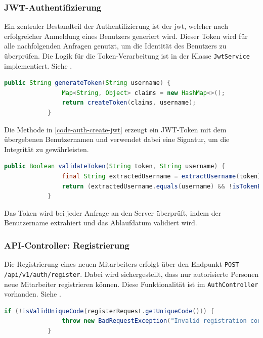 		\subsubsection{JWT-Authentifizierung}
		
		Ein zentraler Bestandteil der Authentifizierung ist der \gls{jwt}, welcher nach erfolgreicher Anmeldung eines Benutzers generiert wird. Dieser Token wird für alle nachfolgenden Anfragen genutzt, um die Identität des Benutzers zu überprüfen. Die Logik für die Token-Verarbeitung ist in der Klasse \texttt{JwtService} implementiert. Siehe \cite{prompt-gpt-authentication-implementation}.
		
		\begin{lstlisting}[caption={Generierung eines JWT-Tokens für einen Benutzer.}, label={code-auth-create-jwt}, language=Java]
			public String generateToken(String username) {
				Map<String, Object> claims = new HashMap<>();
				return createToken(claims, username);
			}
		\end{lstlisting}
		
		
		Die Methode in \ref{code-auth-create-jwt} erzeugt ein JWT-Token mit dem übergebenen Benutzernamen und verwendet dabei eine Signatur, um die Integrität zu gewährleisten. 
		
		\begin{lstlisting}[caption={Validierung eines JWT-Tokens.}, label={code-auth-validate-jwt}, language=Java]
			public Boolean validateToken(String token, String username) {
				final String extractedUsername = extractUsername(token);
				return (extractedUsername.equals(username) && !isTokenExpired(token));
			}
		\end{lstlisting}
		
		Das Token wird bei jeder Anfrage an den Server überprüft, indem der Benutzername extrahiert und das Ablaufdatum validiert wird.
		
		\subsubsection{API-Controller: Registrierung}
		
		Die Registrierung eines neuen Mitarbeiters erfolgt über den Endpunkt \texttt{POST /api/v1/auth/register}. Dabei wird sichergestellt, dass nur autorisierte Personen neue Mitarbeiter registrieren können. Diese Funktionalität ist im \texttt{AuthController} vorhanden. Siehe \cite{prompt-gpt-authentication-implementation}.
		
		\begin{lstlisting}[caption={Validierung des Registrierungscodes bei der Anmeldung eines neuen Mitarbeiters.}, label={code-auth-employee-reg}, language=Java]
			if (!isValidUniqueCode(registerRequest.getUniqueCode())) {
				throw new BadRequestException("Invalid registration code provided");
			}
		\end{lstlisting}
		
